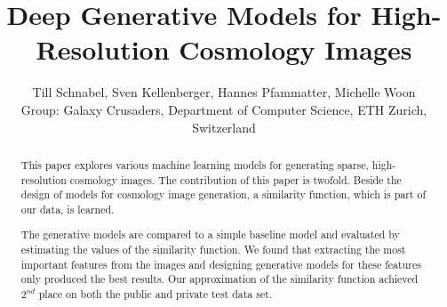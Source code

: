 \documentclass[10pt,conference,compsocconf]{IEEEtran}
\newcommand\TODO[1]{\textcolor{red}{#1}} %
\begin{document}
\title{Deep Generative Models for High-Resolution Cosmology Images}

\author{Till Schnabel, Sven Kellenberger, Hannes Pfammatter, Michelle Woon \\Group: Galaxy Crusaders, Department of Computer Science, ETH Zurich, Switzerland}

\maketitle

\begin{abstract}
This paper explores various machine learning models for generating sparse, high-resolution cosmology images. %
The contribution of this paper is twofold. Beside the design of models for cosmology image generation, a similarity function, which is part of our data, is learned.

The generative models are compared to a simple baseline model and evaluated by estimating the values of the similarity function. We found that extracting the most important features from the images and designing generative models for these features only produced the best results. Our approximation of the similarity function achieved $2^{nd}$ place on both the public and private test data set.




\end{abstract}
\end{document}
